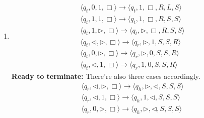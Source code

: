 \documentclass[12pt,a4paper]{article}
\makeatletter
\newtheorem*{solution}{Solution}
\theoremstyle{definition}
\renewenvironment{solution}[1][Solution] {\par\pushQED{\qed}\normalfont\topsep6\p@\@plus6\p@\relax\trivlist\item[\hskip\labelsep\bfseries#1\@addpunct{.}]\ignorespaces}{\popQED\endtrivlist\@endpefalse} \makeatother
\makeatother
\begin{document}
\begin{enumerate}
\begin{solution}
\begin{enumerate}
\begin{align*}
	        \langle q_t, 0, 1, \Box \rangle \rightarrow \langle q_t, 1,\Box,  R, L , S \rangle\\
	        \langle q_t, 1, 1, \Box \rangle \rightarrow \langle q_t, 1,\Box,  R, S , S \rangle\\
	        \langle q_t, 1, \triangleright, \Box \rangle \rightarrow \langle q_t, \triangleright,\Box,  R, S , S \rangle\\
	        \langle q_t, \triangleleft, \triangleright, \Box \rangle \rightarrow \langle q_r, \triangleright,1,  S, S , R
	        \rangle\\
	        \langle q_t, 0, \triangleright, \Box \rangle \rightarrow \langle q_r, \triangleright,0,  S, S , R\rangle\\
	        \langle q_t, \triangleleft, 1, \Box \rangle \rightarrow \langle q_r, 1,0,  S, S , R
	        \rangle
	    \end{align*}
	    \textbf{Ready to terminate:} There're also three cases accordingly.
	    \begin{align*}
	        \langle q_r, \triangleleft, \triangleright, \Box \rangle \rightarrow \langle q_h, \triangleright,\triangleleft,  S, S , S \rangle\\
	        \langle q_r, \triangleleft, 1, \Box \rangle \rightarrow \langle q_h, 1,\triangleleft,  S, S , S \rangle\\
	        \langle q_r, 0, \triangleright, \Box \rangle \rightarrow \langle q_h, \triangleright,\triangleleft,  S, S , S \rangle
	    \end{align*}
	    

\end{enumerate}
\end{solution}
\end{enumerate}
\end{document}

